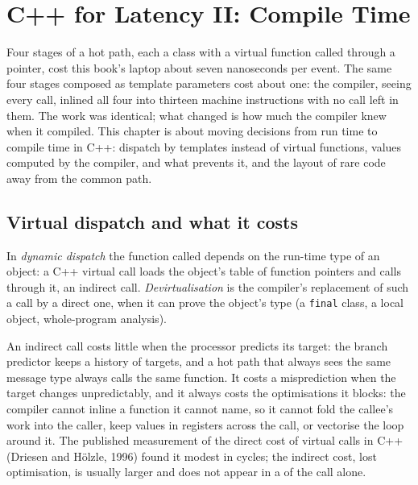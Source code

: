 \chapter{C++ for Latency II: Compile Time}\label{ch:ll:cpp-for-latency-ii-compile-time}

Four stages of a hot path, each a class with a virtual function called through a pointer, cost this book's laptop about
seven nanoseconds per event. The same four stages composed as template parameters cost about one: the compiler, seeing
every call, inlined all four into thirteen machine instructions with no call left in them. The work was identical; what
changed is how much the compiler knew when it compiled. This chapter is about moving decisions from run time to compile
time in C++: dispatch by templates instead of virtual functions, values computed by the compiler,  and what
prevents it, and the layout of rare code away from the common path.

\section{Virtual dispatch and what it costs}

\begin{definition}\label{def:ll:cpp-for-latency-ii-compile-time:dyn}
In \emph{dynamic dispatch} the function called depends on the run-time type of an object: a C++
virtual call loads the object's table of function pointers and calls through it, an indirect call. \emph{Devirtualisation}
is the compiler's replacement of such a call by a direct one, when it can prove the object's type (a \texttt{final}
class, a local object, whole-program analysis).
\end{definition}

An indirect call costs little when the processor predicts its target: the branch predictor keeps a history of targets,
and a hot path that always sees the same message type always calls the same function. It costs a misprediction when the
target changes unpredictably, and it always costs the optimisations it blocks: the compiler cannot inline a function it
cannot name, so it cannot fold the callee's work into the caller, keep values in registers across the call, or vectorise
the loop around it. The published measurement of the direct cost of virtual calls in C++ (Driesen and Hölzle, 1996) found
it modest in cycles; the indirect cost, lost optimisation, is usually larger and does not appear in a  of the
call alone.

